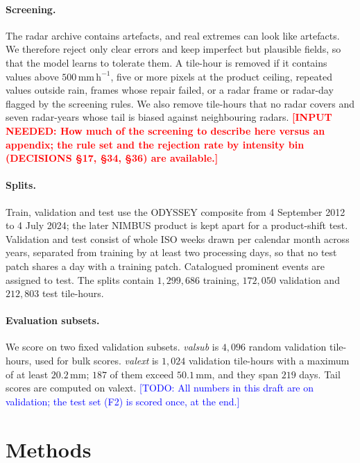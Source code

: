 \documentclass{article}
\newcommand{\needinput}[1]{\textcolor{red}{\textbf{[INPUT NEEDED: #1]}}}
\newcommand{\todo}[1]{\textcolor{blue}{[TODO: #1]}}
\begin{document}
\paragraph{Screening.} The radar archive contains artefacts, and real extremes can look like artefacts. We therefore
reject only clear errors and keep imperfect but plausible fields, so that the model learns to tolerate them. A
tile-hour is removed if it contains values above $500\,\mathrm{mm\,h^{-1}}$, five or more pixels at the product
ceiling, repeated values outside rain, frames whose repair failed, or a radar frame or radar-day flagged by the
screening rules. We also remove tile-hours that no radar covers and seven radar-years whose tail is biased against
neighbouring radars. \needinput{How much of the screening to describe here versus an appendix; the rule set and the
rejection rate by intensity bin (DECISIONS §17, §34, §36) are available.}

\paragraph{Splits.} Train, validation and test use the ODYSSEY composite from 4 September 2012 to 4 July 2024; the later NIMBUS product
is kept apart for a product-shift test. Validation and test consist of whole ISO weeks drawn per
calendar month across years, separated from training by at least two processing days, so that no test patch shares a
day with a training patch. Catalogued prominent events are assigned to test. The splits contain $1{,}299{,}686$
training, $172{,}050$ validation and $212{,}803$ test tile-hours.

\paragraph{Evaluation subsets.} We score on two fixed validation subsets. \emph{valsub} is $4{,}096$ random
validation tile-hours, used for bulk scores. \emph{valext} is $1{,}024$ validation tile-hours with a maximum of at
least $20.2\,\mathrm{mm}$; $187$ of them exceed $50.1\,\mathrm{mm}$, and they span $219$ days. Tail scores are
computed on valext. \todo{All numbers in this draft are on validation; the test set (F2) is scored once, at the end.}

\section{Methods}
\end{document}
